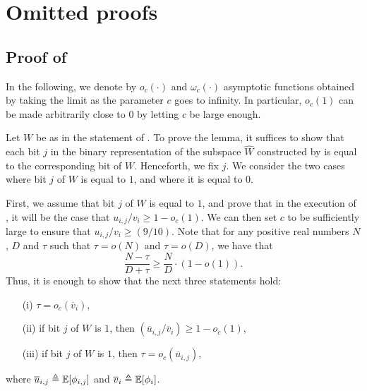 \appendix

\section{Omitted proofs}


\subsection{Proof of }\label{subsec:pf_rec_lem}
	In the following, we denote by $o_c(\cdot)$ and $\omega_c(\cdot)$ asymptotic functions obtained by taking the limit as the parameter $c$ goes to infinity. In particular, $o_c(1)$ can be made arbitrarily close to $0$ by letting $c$ be large enough.
	
	Let $W$ be as in the statement of . To prove the lemma, it suffices to show that each bit $j$ in the binary representation of the subspace $\widehat{W}$ constructed by  is equal to the corresponding bit of $W$. Henceforth, we fix $j$. We consider the two cases where bit $j$ of $W$ is equal to $1$, and where it is equal to $0$. 
	
	First, we assume that bit $j$ of $W$ is equal to $1$, and prove that in the execution of , it will be the case that $u_{i,j}/v_i \geq 1- o_c(1)$.  We can then set $c$ to be sufficiently large to ensure that $u_{i,j}/v_i \geq  (9/10)$. Note that for any positive real numbers $N$, $D$ and $\tau$ such that $\tau = o(N)$ and $\tau = o(D)$, we have that
	\begin{equation*}
	\frac{N-\tau}{D+\tau} \geq \frac{N}{D} \cdot (1-o(1)).
	\end{equation*}
	Thus, it is enough to show that the next three statements hold:
	\begin{enumerate}
		\item[(i)] $\tau = o_c( \overline{v}_i )$,
		\item[(ii)] if bit $j$ of $W$ is $1$, then $(\overline{u}_{i,j}/\overline{v}_i)	\geq 1 - o_c(1)$,
		\item[(iii)] if bit $j$ of $W$ is $1$, then $\tau = o_c( \overline{u}_{i,j} )$,
	\end{enumerate}
	where $\overline{u}_{i,j} \triangleq \mathbb E[\phi_{i,j}]$ and $\overline{v}_i \triangleq \mathbb E[\phi_i]$.
	
